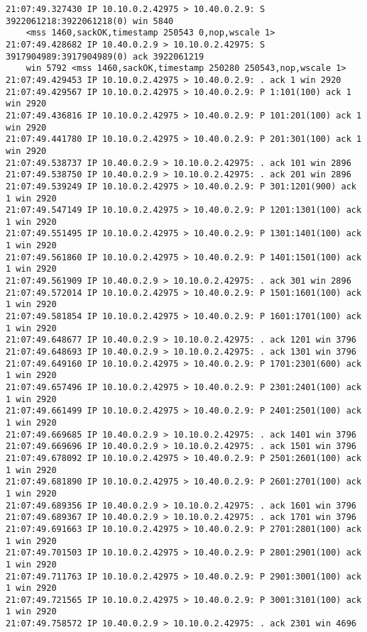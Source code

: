 \documentclass[a4paper,12pt]{article}
\begin{document}
\begin{Verbatim}
21:07:49.327430 IP 10.10.0.2.42975 > 10.40.0.2.9: S 3922061218:3922061218(0) win 5840 
	<mss 1460,sackOK,timestamp 250543 0,nop,wscale 1>
21:07:49.428682 IP 10.40.0.2.9 > 10.10.0.2.42975: S 3917904989:3917904989(0) ack 3922061219 
	win 5792 <mss 1460,sackOK,timestamp 250280 250543,nop,wscale 1>
21:07:49.429453 IP 10.10.0.2.42975 > 10.40.0.2.9: . ack 1 win 2920 
21:07:49.429567 IP 10.10.0.2.42975 > 10.40.0.2.9: P 1:101(100) ack 1 win 2920 
21:07:49.436816 IP 10.10.0.2.42975 > 10.40.0.2.9: P 101:201(100) ack 1 win 2920 
21:07:49.441780 IP 10.10.0.2.42975 > 10.40.0.2.9: P 201:301(100) ack 1 win 2920 
21:07:49.538737 IP 10.40.0.2.9 > 10.10.0.2.42975: . ack 101 win 2896 
21:07:49.538750 IP 10.40.0.2.9 > 10.10.0.2.42975: . ack 201 win 2896 
21:07:49.539249 IP 10.10.0.2.42975 > 10.40.0.2.9: P 301:1201(900) ack 1 win 2920 
21:07:49.547149 IP 10.10.0.2.42975 > 10.40.0.2.9: P 1201:1301(100) ack 1 win 2920 
21:07:49.551495 IP 10.10.0.2.42975 > 10.40.0.2.9: P 1301:1401(100) ack 1 win 2920 
21:07:49.561860 IP 10.10.0.2.42975 > 10.40.0.2.9: P 1401:1501(100) ack 1 win 2920 
21:07:49.561909 IP 10.40.0.2.9 > 10.10.0.2.42975: . ack 301 win 2896 
21:07:49.572014 IP 10.10.0.2.42975 > 10.40.0.2.9: P 1501:1601(100) ack 1 win 2920 
21:07:49.581854 IP 10.10.0.2.42975 > 10.40.0.2.9: P 1601:1701(100) ack 1 win 2920 
21:07:49.648677 IP 10.40.0.2.9 > 10.10.0.2.42975: . ack 1201 win 3796 
21:07:49.648693 IP 10.40.0.2.9 > 10.10.0.2.42975: . ack 1301 win 3796 
21:07:49.649160 IP 10.10.0.2.42975 > 10.40.0.2.9: P 1701:2301(600) ack 1 win 2920 
21:07:49.657496 IP 10.10.0.2.42975 > 10.40.0.2.9: P 2301:2401(100) ack 1 win 2920 
21:07:49.661499 IP 10.10.0.2.42975 > 10.40.0.2.9: P 2401:2501(100) ack 1 win 2920 
21:07:49.669685 IP 10.40.0.2.9 > 10.10.0.2.42975: . ack 1401 win 3796 
21:07:49.669696 IP 10.40.0.2.9 > 10.10.0.2.42975: . ack 1501 win 3796 
21:07:49.678092 IP 10.10.0.2.42975 > 10.40.0.2.9: P 2501:2601(100) ack 1 win 2920 
21:07:49.681890 IP 10.10.0.2.42975 > 10.40.0.2.9: P 2601:2701(100) ack 1 win 2920 
21:07:49.689356 IP 10.40.0.2.9 > 10.10.0.2.42975: . ack 1601 win 3796 
21:07:49.689367 IP 10.40.0.2.9 > 10.10.0.2.42975: . ack 1701 win 3796 
21:07:49.691663 IP 10.10.0.2.42975 > 10.40.0.2.9: P 2701:2801(100) ack 1 win 2920 
21:07:49.701503 IP 10.10.0.2.42975 > 10.40.0.2.9: P 2801:2901(100) ack 1 win 2920 
21:07:49.711763 IP 10.10.0.2.42975 > 10.40.0.2.9: P 2901:3001(100) ack 1 win 2920 
21:07:49.721565 IP 10.10.0.2.42975 > 10.40.0.2.9: P 3001:3101(100) ack 1 win 2920 
21:07:49.758572 IP 10.40.0.2.9 > 10.10.0.2.42975: . ack 2301 win 4696 

\end{Verbatim}
\end{document}
